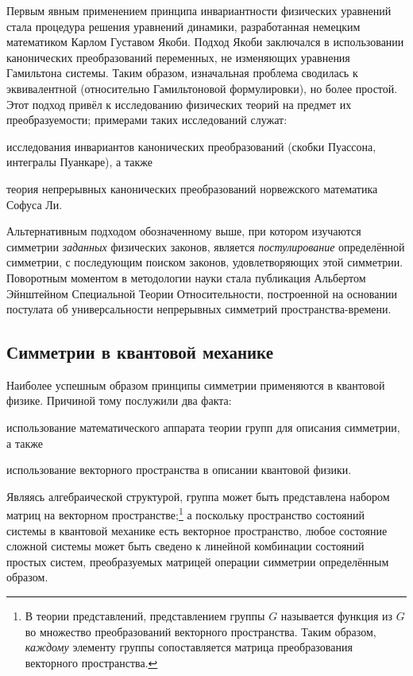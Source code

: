 \documentclass[14pt]{extarticle}
\begin{document}
Первым явным применением принципа инвариантности физических уравнений стала процедура решения уравнений динамики, разработанная немецким математиком Карлом Густавом Якоби. Подход Якоби заключался в использовании канонических преобразований переменных, не изменяющих уравнения Гамильтона системы. Таким образом, изначальная проблема сводилась к эквивалентной (относительно Гамильтоновой формулировки), но более простой. Этот подход привёл к исследованию физических теорий на предмет их преобразуемости; примерами таких исследований служат:
\begin{inparaenum}[(i)]
	\item исследования инвариантов канонических преобразований (скобки Пуассона, интегралы Пуанкаре), а также
	\item теория непрерывных канонических преобразований норвежского математика Софуса Ли.
\end{inparaenum}

Альтернативным подходом обозначенному выше, при котором изучаются симметрии \emph{заданных} физических законов, является \emph{постулирование} определённой симметрии, с последующим поиском законов, удовлетворяющих этой симметрии. Поворотным моментом в методологии науки стала публикация Альбертом Эйнштейном Специальной Теории Относительности, построенной на основании постулата об универсальности непрерывных симметрий пространства-времени.~\cite{SEP.Symmetry}

\subsection{Симметрии в квантовой механике}

Наиболее успешным образом принципы симметрии применяются в квантовой физике. Причиной тому послужили два факта: 
\begin{inparaenum}[(1)]
	\item использование математического аппарата теории групп для описания симметрии, а также
	\item использование векторного пространства в описании квантовой физики.
\end{inparaenum}

Являясь алгебраической структурой, группа может быть представлена набором матриц на векторном пространстве;\footnote{В теории представлений, представлением группы $G$ называется функция из $G$ во множество преобразований векторного пространства. Таким образом, \emph{каждому} элементу группы сопоставляется матрица преобразования векторного пространства.} а поскольку пространство состояний системы в квантовой механике есть векторное пространство, любое состояние сложной системы может быть сведено к линейной комбинации состояний простых систем, преобразуемых матрицей операции симметрии определённым образом.
\end{document}
